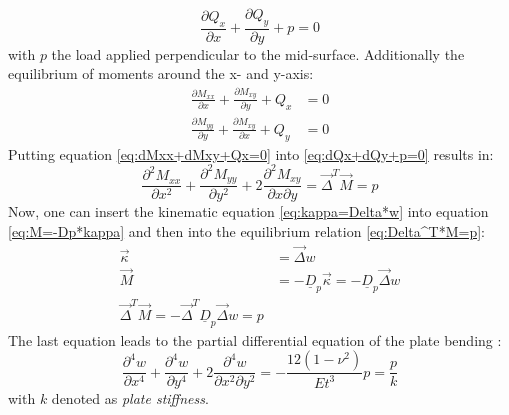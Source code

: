   \begin{equation}\label{eq:dQx+dQy+p=0}
  \frac{\partial Q_x}{\partial x} + \frac{\partial Q_y}{\partial y} + p = 0
  \end{equation}
  with $p$ the load applied perpendicular to the mid-surface. Additionally the equilibrium of moments around the x- and y-axis:\\
  \begin{align}\label{eq:dMxx+dMxy+Qx=0}
  \frac{\partial M_{xx}}{\partial x} + \frac{\partial M_{xy}}{\partial y} + Q_x &= 0 \nonumber\\
  \frac{\partial M_{yy}}{\partial y} + \frac{\partial M_{xy}}{\partial x} + Q_y &= 0
  \end{align}
  Putting equation \ref{eq:dMxx+dMxy+Qx=0} into \ref{eq:dQx+dQy+p=0} results in:
  \begin{equation}\label{eq:Delta^T*M=p}
  \frac{\partial^2 M_{xx}}{\partial x^2} + \frac{\partial^2 M_{yy}}{\partial y^2} + 2\frac{\partial^2 M_{xy}}{\partial x\partial y} = \vec{\Delta}^T \vec{M} = p
  \end{equation}
  Now, one can insert the kinematic equation \ref{eq:kappa=Delta*w} into equation \ref{eq:M=-Dp*kappa} and then into the equilibrium relation \ref{eq:Delta^T*M=p}:
  \begin{align}
  \vec{\kappa} &= \vec{\Delta}w \nonumber\\
  \vec{M} &= -\underline{D}_p \vec{\kappa} = -\underline{D}_p \vec{\Delta} w \nonumber\\
  \vec{\Delta}^T \vec{M} = -\vec{\Delta}^T \underline{D}_p \vec{\Delta} w = p
  \end{align}
  The last equation leads to the partial differential equation of the plate bending \cite{klein2013fem}:
  \begin{equation}
  \frac{\partial^4 w}{\partial x^4} + \frac{\partial^4 w}{\partial y^4} + 2\frac{\partial^4 w}{\partial x^2 \partial y^2} = -\frac{12(1-\nu^2)}{E t^3} p = \frac{p}{k}
  \end{equation}
  with $k$ denoted as \textit{plate stiffness}.
  
